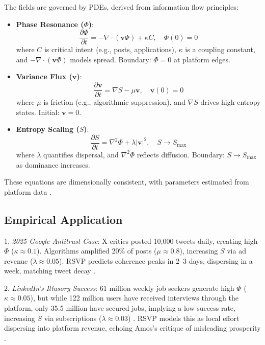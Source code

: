 \documentclass{article}
\begin{document}
The fields are governed by PDEs, derived from information flow principles:

\begin{itemize}
    \item \textbf{Phase Resonance ($\Phi$)}:
    \[
    \frac{\partial \Phi}{\partial t} = -\nabla \cdot (\mathbf{v} \Phi) + \kappa C, \quad \Phi(0) = 0
    \]
    where $C$ is critical intent (e.g., posts, applications), $\kappa$ is a coupling constant, and $-\nabla \cdot (\mathbf{v} \Phi)$ models spread. Boundary: $\Phi = 0$ at platform edges.
    \item \textbf{Variance Flux ($\mathbf{v}$)}:
    \[
    \frac{\partial \mathbf{v}}{\partial t} = \nabla S - \mu \mathbf{v}, \quad \mathbf{v}(0) = 0
    \]
    where $\mu$ is friction (e.g., algorithmic suppression), and $\nabla S$ drives high-entropy states. Initial: $\mathbf{v} = 0$.
    \item \textbf{Entropy Scaling ($S$)}:
    \[
    \frac{\partial S}{\partial t} = \nabla^2 \Phi + \lambda |\mathbf{v}|^2, \quad S \to S_{\text{max}}
    \]
    where $\lambda$ quantifies dispersal, and $\nabla^2 \Phi$ reflects diffusion. Boundary: $S \to S_{\text{max}}$ as dominance increases.
\end{itemize}

These equations are dimensionally consistent, with parameters estimated from platform data \cite{x2025,kinsta2025linkedin}.

\subsection{Empirical Application}

1. \textit{2025 Google Antitrust Case}: X critics posted 10,000 tweets daily, creating high $\Phi$ ($\kappa \approx 0.1$). Algorithms amplified 20\% of posts ($\mu \approx 0.8$), increasing $S$ via ad revenue ($\lambda \approx 0.05$). RSVP predicts coherence peaks in 2--3 days, dispersing in a week, matching tweet decay \cite{x2025,doj2025}.

2. \textit{LinkedIn’s Illusory Success}: 61 million weekly job seekers generate high $\Phi$ ($\kappa \approx 0.05$), but while 122 million users have received interviews through the platform, only 35.5 million have secured jobs, implying a low success rate, increasing $S$ via subscriptions ($\lambda \approx 0.03$) \cite{kinsta2025linkedin,ghedau2025linkedin}. RSVP models this as local effort dispersing into platform revenue, echoing Amos’s critique of misleading prosperity \cite{amos2024}.
\end{document}
